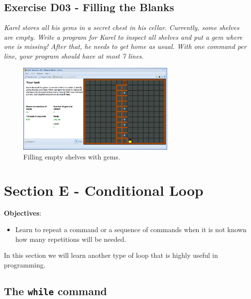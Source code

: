 \documentclass[article,A4,12pt]{llncs}
\begin{document}
\subsection{Exercise D03 - Filling the Blanks}

{\em Karel stores all his gems in a secret chest in his cellar. 
Currently, some shelves are empty. Write a program for Karel to 
inspect all shelves and put a gem where one is missing! After that, he needs to get 
home as usual. With one 
command per line, your program should have at most 7 lines.}

\begin{figure}[!ht]
\begin{center}
\includegraphics[width=0.7\textwidth]{img/d03.png}
\end{center}
\vspace{-4mm}
\caption{Filling empty shelves with gems.}
\label{fig:d03}
\vspace{-4mm}
\end{figure}
\noindent



\section{Section E - Conditional Loop}

\noindent
{\bf Objectives}: 
\begin{itemize}
\item Learn to repeat a command or a sequence of commands when it is not known 
      how many repetitions will be needed.
\end{itemize}

\noindent
In this section we will learn another type of loop that is highly useful 
in programming.

\subsection{The {\tt while} command}
\end{document}
